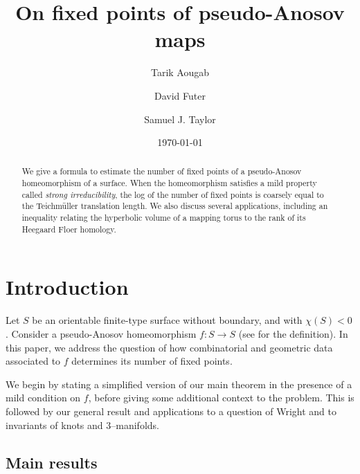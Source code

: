 \documentclass[11pt,letterpaper]{amsart}
\numberwithin{equation}{section}
\theoremstyle{definition}
\begin{document}
\title[On fixed points of pseudo-Anosov maps]{On fixed points of pseudo-Anosov maps}

\author{Tarik Aougab}
\address{Department of Mathematics\\ 
Haverford College}


\author{David Futer}
\address{Department of Mathematics\\ 
Temple University}

\author{Samuel J. Taylor}
\address{Department of Mathematics\\ 
Temple University}




\begin{abstract}
We give a formula to estimate the number of fixed points of a pseudo-Anosov homeomorphism of a surface. When the homeomorphism satisfies a mild property called \emph{strong irreducibility}, the log of the number of fixed points is coarsely equal to the Teichm\"uller translation length. We also discuss several applications, including an inequality relating the hyperbolic volume of a mapping torus to the rank of its Heegaard Floer homology.
\end{abstract}

\date{\today}
\maketitle


\section{Introduction}
Let $S$ be an orientable finite-type surface without boundary, and with $\chi(S) < 0$. Consider a pseudo-Anosov homeomorphism $f \colon S \to S$ (see  for the definition).  In this paper, we address the question of how combinatorial and geometric data associated to $f$ determines its number of fixed points. 

We begin by stating a simplified version of our main theorem in the presence of a mild condition on $f$, before giving some additional context to the problem. This is followed by our general result and applications to a question of Wright and to invariants of knots and $3$--manifolds.

\subsection*{Main results}
\end{document}
